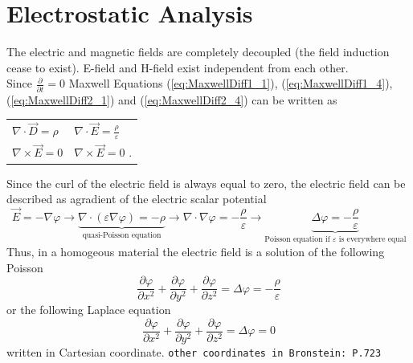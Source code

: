 \section{Electrostatic Analysis}

The electric and magnetic fields are completely decoupled (the field induction cease to exist). E-field and H-field exist independent from each other. \\

Since $\frac{\partial}{\partial t} = 0$ Maxwell Equations (\ref{eq:MaxwellDiff1_1}), (\ref{eq:MaxwellDiff1_4}), (\ref{eq:MaxwellDiff2_1}) and (\ref{eq:MaxwellDiff2_4}) can be written as

\begin{tabular}{ll}
	\(\displaystyle \nabla \cdot \vec{D} = \rho \) & \(\displaystyle \nabla \cdot \vec{E} = \frac{\rho}{\varepsilon} \) \\
	\(\displaystyle \nabla \times \vec{E} = 0 \) \hspace{2cm} & \(\displaystyle \nabla \times \vec{E} = 0 \) .
\end{tabular}

Since the curl of the electric field is always equal to zero, the electric field can be described as agradient of the electric scalar potential
\begin{equation*}
	\vec{E} = -\nabla \varphi \rightarrow \underbrace{\nabla \cdot \left(\varepsilon \nabla \varphi\right) = -\rho}_{\text{quasi-Poisson equation}} \rightarrow \nabla \cdot \nabla \varphi = -\frac{\rho}{\varepsilon} \rightarrow \underbrace{\Delta \varphi = -\frac{\rho}{\varepsilon}}_{\text{Poisson equation if $\varepsilon$ is everywhere equal}}
\end{equation*}
Thus, in a homogeous material the electric field is a solution of the following Poisson
\begin{equation*}
	\frac{\partial \varphi}{\partial x^2} + \frac{\partial \varphi}{\partial y^2} +\frac{\partial \varphi}{\partial z^2} = \Delta \varphi = - \frac{\rho}{\varepsilon}
\end{equation*}
or the following Laplace equation
\begin{equation*}
	\frac{\partial \varphi}{\partial x^2} + \frac{\partial \varphi}{\partial y^2} +\frac{\partial \varphi}{\partial z^2} = \Delta \varphi = 0
\end{equation*}
written in Cartesian coordinate. {\tiny \texttt{other coordinates in Bronstein: P.723}}

